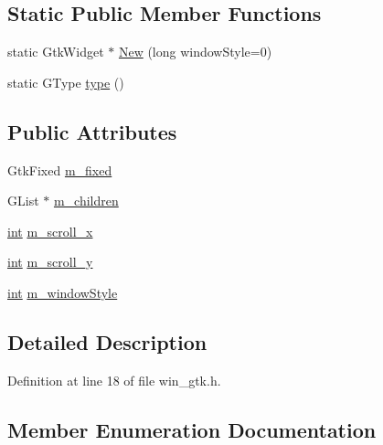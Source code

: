 \subsection*{Static Public Member Functions}
\begin{DoxyCompactItemize}
\item 
static Gtk\+Widget $\ast$ \hyperlink{structwx_pizza_aae55b03773fd6bd9d6035c54af081ba2}{New} (long window\+Style=0)
\item 
static G\+Type \hyperlink{structwx_pizza_aaae9914b17125f7c7c84dbe9d904f5c1}{type} ()
\end{DoxyCompactItemize}
\subsection*{Public Attributes}
\begin{DoxyCompactItemize}
\item 
Gtk\+Fixed \hyperlink{structwx_pizza_ab4e9dc855ede2c35018922797e3bec6e}{m\+\_\+fixed}
\item 
G\+List $\ast$ \hyperlink{structwx_pizza_a427b3311d44cb4f76e0aa4c2288192ef}{m\+\_\+children}
\item 
\hyperlink{xmltok_8h_a5a0d4a5641ce434f1d23533f2b2e6653}{int} \hyperlink{structwx_pizza_a7db041d5b671dce52cab76769b01729c}{m\+\_\+scroll\+\_\+x}
\item 
\hyperlink{xmltok_8h_a5a0d4a5641ce434f1d23533f2b2e6653}{int} \hyperlink{structwx_pizza_ad702b47c50c11f426c7f4eadd891475a}{m\+\_\+scroll\+\_\+y}
\item 
\hyperlink{xmltok_8h_a5a0d4a5641ce434f1d23533f2b2e6653}{int} \hyperlink{structwx_pizza_ac6d59a398b2c3e5024939a0325b1ca38}{m\+\_\+window\+Style}
\end{DoxyCompactItemize}


\subsection{Detailed Description}


Definition at line 18 of file win\+\_\+gtk.\+h.



\subsection{Member Enumeration Documentation}
